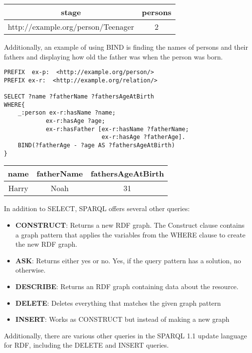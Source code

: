 \para
\begin{tabular}{@{}cc@{}}
    \toprule
    stage & persons  \\ \midrule
    http://example.org/person/Teenager & 2 \\ \bottomrule
\end{tabular}

\para
Additionally, an example of using BIND is finding the names of persons and their fathers and displaying how old the father was when the person was born.
\begin{lstlisting}[frame=single, language=turtle, frame=none]
PREFIX  ex-p:  <http://example.org/person/> 
PREFIX ex-r:  <http://example.org/relation/> 

SELECT ?name ?fatherName ?fathersAgeAtBirth
WHERE{
    _:person ex-r:hasName ?name;
            ex-r:hasAge ?age;
            ex-r:hasFather [ex-r:hasName ?fatherName;
                            ex-r:hasAge ?fatherAge].
    BIND(?fatherAge - ?age AS ?fathersAgeAtBirth)
}
\end{lstlisting}
    
\para
\begin{tabular}{@{}ccc@{}}
    \toprule
    name & fatherName & fathersAgeAtBirth \\ \midrule
    Harry & Noah & 31\\\bottomrule
\end{tabular}



\para
In addition to SELECT, SPARQL offers several other queries:
\begin{itemize}
    \item \textbf{CONSTRUCT}: Returns a new RDF graph. The Construct clause contains a graph pattern that applies the variables from the WHERE clause to create the new RDF graph. 
    \item \textbf{ASK}: Returns either yes or no. Yes, if the query pattern has a solution, no otherwise. 
    \item \textbf{DESCRIBE}: Returns an RDF graph containing data about the resource. 
    \item \textbf{DELETE}: Deletes everything that matches the given graph pattern 
    \item \textbf{INSERT}: Works as CONSTRUCT but instead of making a new graph
\end{itemize}
Additionally, there are various other queries in the SPARQL 1.1 update language for RDF\cite{SPARQL1.1Update}, including the DELETE and INSERT queries.  

